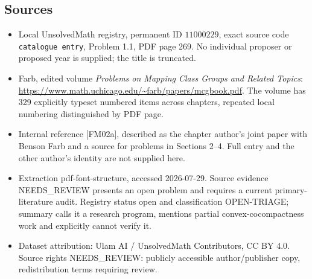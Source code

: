 \documentclass[11pt]{article}
\begin{document}
\subsection{Sources}
\begin{itemize}
\item Local UnsolvedMath registry, permanent ID \(11000229\), exact source code \texttt{catalogue entry}, Problem 1.1, PDF page 269. No individual proposer or proposed year is supplied; the title is truncated.
\item Farb, edited volume \emph{Problems on Mapping Class Groups and Related Topics}: \url{https://www.math.uchicago.edu/~farb/papers/mcgbook.pdf}. The volume has 329 explicitly typeset numbered items across chapters, repeated local numbering distinguished by PDF page.
\item Internal reference [FM02a], described as the chapter author's joint paper with Benson Farb and a source for problems in Sections 2--4. Full entry and the other author's identity are not supplied here.
\item Extraction pdf-font-structure, accessed 2026-07-29. Source evidence NEEDS\_REVIEW presents an open problem and requires a current primary-literature audit. Registry status open and classification OPEN-TRIAGE; summary calls it a research program, mentions partial convex-cocompactness work and explicitly cannot verify it.
\item Dataset attribution: Ulam AI / UnsolvedMath Contributors, CC BY 4.0. Source rights NEEDS\_REVIEW: publicly accessible author/publisher copy, redistribution terms requiring review.
\end{itemize}
\end{document}
